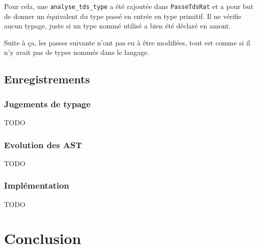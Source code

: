 \documentclass[headings=standardclasses,parskip=half]{scrartcl}
\begin{document}
Pour cela, une \texttt{analyse\_tds\_type} a été rajoutée dans
\texttt{PasseTdsRat} et a pour but de donner un équivalent du type passé
en entrée en type primitif.
Il ne vérifie aucun typage, juste si un type nommé utilisé a bien été
déclaré en amont.

Suite à ça, les passes suivante n'ont pas eu à être modifiées, tout
est comme si il n'y avait pas de types nommés dans le langage.

\subsection{Enregistrements}

\subsubsection*{Jugements de typage}

TODO

\subsubsection*{Evolution des AST}

TODO

\subsubsection*{Implémentation}

TODO

\section{Conclusion}
\end{document}
